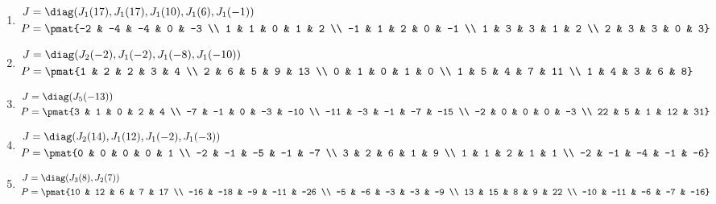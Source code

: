 \begin{enumerate}
\item

\begin{align*}
J &= \diag(J_{1}(17), J_{1}(17), J_{1}(10), J_{1}(6), J_{1}(-1))\\
P &= \pmat{-2 & -4 & -4 & 0 & -3 \\ 1 & 1 & 0 & 1 & 2 \\ -1 & 1 & 2 & 0 & -1 \\ 1 & 3 & 3 & 1 & 2 \\ 2 & 3 & 3 & 0 & 3}
\end{align*}

\item

\begin{align*}
J &= \diag(J_{2}(-2), J_{1}(-2), J_{1}(-8), J_{1}(-10))\\
P &= \pmat{1 & 2 & 2 & 3 & 4 \\ 2 & 6 & 5 & 9 & 13 \\ 0 & 1 & 0 & 1 & 0 \\ 1 & 5 & 4 & 7 & 11 \\ 1 & 4 & 3 & 6 & 8}
\end{align*}

\item

\begin{align*}
J &= \diag(J_{5}(-13))\\
P &= \pmat{3 & 1 & 0 & 2 & 4 \\ -7 & -1 & 0 & -3 & -10 \\ -11 & -3 & -1 & -7 & -15 \\ -2 & 0 & 0 & 0 & -3 \\ 22 & 5 & 1 & 12 & 31}
\end{align*}

\item

\begin{align*}
J &= \diag(J_{2}(14), J_{1}(12), J_{1}(-2), J_{1}(-3))\\
P &= \pmat{0 & 0 & 0 & 0 & 1 \\ -2 & -1 & -5 & -1 & -7 \\ 3 & 2 & 6 & 1 & 9 \\ 1 & 1 & 2 & 1 & 1 \\ -2 & -1 & -4 & -1 & -6}
\end{align*}

\item

\begin{align*}
J &= \diag(J_{3}(8), J_{2}(7))\\
P &= \pmat{10 & 12 & 6 & 7 & 17 \\ -16 & -18 & -9 & -11 & -26 \\ -5 & -6 & -3 & -3 & -9 \\ 13 & 15 & 8 & 9 & 22 \\ -10 & -11 & -6 & -7 & -16}
\end{align*}


\end{enumerate}
